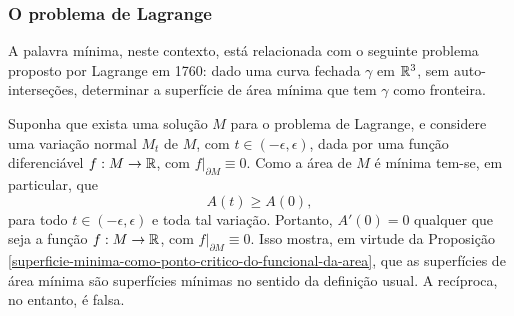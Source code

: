 \documentclass[12pt,a4paper]{beamer}
\theoremstyle{definition}
\begin{document}
\begin{frame}[allowframebreaks]
	\frametitle{O problema de Lagrange}
	
	A palavra mínima, neste contexto, está relacionada com o seguinte problema proposto por Lagrange em 1760: dado uma curva fechada $\gamma$ em $\mathbb R^3$, sem auto-interseções, determinar a superfície de área mínima que tem $\gamma$ como fronteira.
	
	Suponha que exista uma solução $M$ para o problema de Lagrange, e considere uma variação normal $M_t$ de $M$, com $t \in (-\epsilon,\epsilon)$, dada por uma função diferenciável $f: M \rightarrow \mathbb R$, com $f \vert_{\partial M} \equiv 0$. Como a área de $M$ é mínima tem-se, em particular, que
	\begin{equation*}
	A(t) \geq A(0),
	\end{equation*}
	para todo $t \in (-\epsilon,\epsilon)$ e toda tal variação. Portanto, $A'(0)=0$ qualquer que seja a função $f: M \rightarrow \mathbb R$, com $f \vert_{\partial M} \equiv 0$. Isso mostra, em virtude da Proposição \ref{superficie-minima-como-ponto-critico-do-funcional-da-area}, que as superfícies de área mínima são superfícies mínimas no sentido da definição usual. A recíproca, no entanto, é falsa.
\end{frame}
\end{document}
